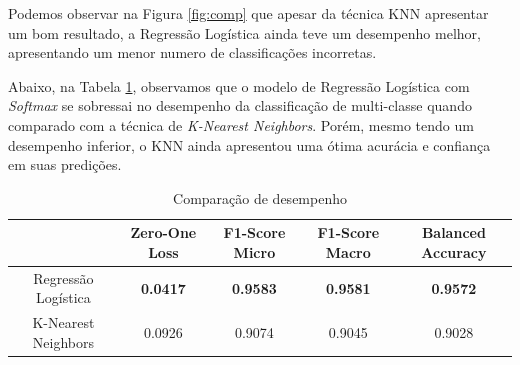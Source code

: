 \documentclass[12pt]{article}
\begin{document}
Podemos observar na Figura \ref{fig:comp} que apesar da técnica KNN apresentar um bom resultado, a Regressão Logística ainda teve um desempenho melhor, apresentando um menor numero de classificações incorretas.

Abaixo, na Tabela \ref{tab:comp_d}, observamos que o modelo de Regressão Logística com \textit{Softmax} se sobressai no desempenho da classificação de multi-classe quando comparado com a técnica de \textit{K-Nearest Neighbors}. Porém, mesmo tendo um desempenho inferior, o KNN ainda apresentou uma ótima acurácia e confiança em suas predições.

 
\begin{table}[H]
	\caption{Comparação de desempenho}
	\label{tab:comp_d}
	\begin{tabular}{c|cccc}
		& Zero-One Loss & F1-Score Micro & F1-Score Macro & Balanced Accuracy \\ \hline
		Regressão Logística & \textbf{0.0417}        & \textbf{0.9583}         & \textbf{0.9581}         & \textbf{0.9572}            \\ \hline
		K-Nearest Neighbors & 0.0926        & 0.9074         & 0.9045         & 0.9028           
	\end{tabular}
\end{table}
\end{document}
